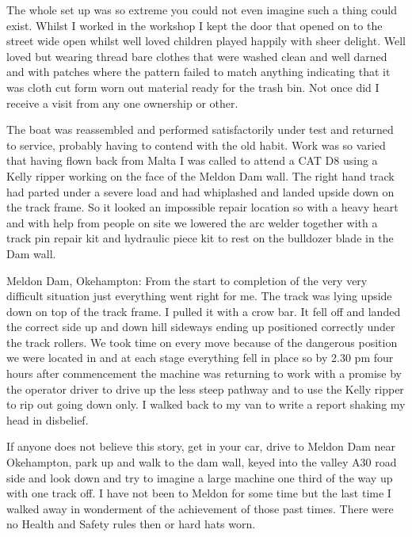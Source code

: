 
The whole set up was so extreme you could not even imagine such a thing could
exist.  Whilst I worked in the workshop I kept the door that opened on to the
street wide open whilst well loved children played happily with sheer delight.
Well loved but wearing thread bare clothes that were washed clean and well
darned and with patches where the pattern failed to match anything indicating
that it was cloth cut form worn out material ready for the trash bin.  Not once
did I receive a visit from any one ownership or other.

The boat was reassembled and performed satisfactorily under test and returned to
service, probably having to contend with the old habit.  Work was so varied
that having flown back from Malta I was called to attend a CAT D8 using a Kelly
ripper working on the face of the Meldon Dam wall.  The right hand track had
parted under a severe load and had whiplashed and landed upside down on the
track frame.  So it looked an impossible repair location so with a heavy heart
and with help from people on site we lowered the arc welder together with a
track pin repair kit and hydraulic piece kit to rest on the bulldozer blade in
the Dam wall.

Meldon Dam, Okehampton:  From the start to completion of the very very difficult
situation just everything went right for me.  The track was lying upside down
on top of the track frame.  I pulled it with a crow bar.  It fell off and
landed the correct side up and down hill sideways ending up positioned
correctly under the track rollers.  We took time on every move because of the
dangerous position we were located in and at each stage everything fell in
place so by 2.30 pm four hours after commencement the machine was returning to
work with a promise by the operator driver to drive up the less steep pathway
and to use the Kelly ripper to rip out going down only.  I walked back to my
van to write a report shaking my head in disbelief.

If anyone does not believe this story, get in your car, drive to Meldon Dam near
Okehampton, park up and walk to the dam wall, keyed into the valley A30 road
side and look down and try to imagine a large machine one third of the way up
with one track off. I have not been to Meldon for some time but the last time I
walked away in wonderment of the achievement of those past times.  There were
no Health and Safety rules then or hard hats worn.


